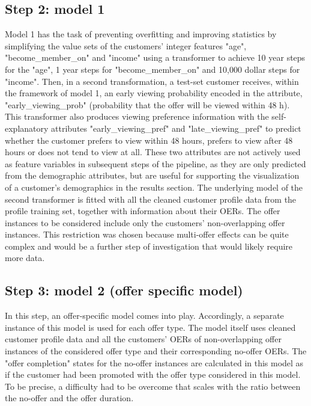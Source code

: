\documentclass[11pt]{article} %
\begin{document}
\subsection{\label{model step 2}Step 2: model 1}
Model 1 has the task of preventing overfitting and improving statistics by simplifying the value sets of the customers' integer features "age", "become\_member\_on" and "income" using a transformer to achieve 10 year steps for the "age", 1 year steps for "become\_member\_on" and 10,000 dollar steps for "income".
Then, in a second transformation, a test-set customer receives, within the framework of model 1, an early viewing probability encoded in the attribute, "early\_viewing\_prob" (probability that the offer will be viewed within 48 h).
This transformer also produces viewing preference information with the self-explanatory attributes "early\_viewing\_pref" and "late\_viewing\_pref" to predict whether the customer prefers to view within 48 hours, prefers to view after 48 hours or does not tend to view at all.
These two attributes are not actively used as feature variables in subsequent steps of the pipeline, as they are only predicted from the demographic attributes, but are useful for supporting the visualization of a customer's demographics in the results section.
The underlying model of the second transformer is fitted with all the cleaned customer profile data from the profile training set, together with information about their OERs. The offer instances to be considered include only the customers' non-overlapping offer instances. This restriction was chosen because multi-offer effects can be quite complex and would be a further step of investigation that would likely require more data.


\subsection{\label{model step 3}Step 3: model 2 (offer specific model)}

In this step, an offer-specific model comes into play. Accordingly, a separate instance of this model is used for each offer type.
The model itself uses cleaned customer profile data and all the customers' OERs of non-overlapping offer instances of the considered offer type and their corresponding no-offer OERs.
The "offer completion" states for the no-offer instances are calculated in this model as if the customer had been promoted with the offer type considered in this model.
To be precise, a difficulty had to be overcome that scales with the ratio between the no-offer and the offer duration.
\end{document}
